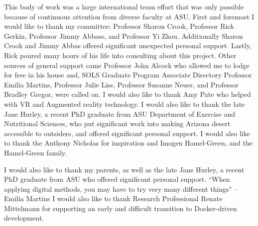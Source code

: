 This body of work was a large international team effort that was only possible because of continuous attention from diverse faculty at ASU. 
\linebreak 
\linebreak 
First and foremost I would like to thank my committee: Professor Sharon Crook, Professor Rick Gerkin, Professor Jimmy Abbass, and Professor Yi Zhou. 
Additionally Sharon Crook and Jimmy Abbas offered significant unexpected personal support.
Lastly, Rick poured many hours of his life into consulting about this project.
\linebreak 
\linebreak 
Other sources of general support came Professor John Alcock who allowed me to lodge for free in his house and, SOLS Graduate Program Associate Directory Professor Emilia Martins, Professor Julie Liss, Professor Susanne Neuer, and Professor Bradley Gregor, were called on. I would also like to thank Amy Pate who helped with VR and Augmented reality technology.
\linebreak 
\linebreak 
I would also like to thank the late Jane Hurley, a recent PhD graduate from ASU Department of Exercise and Nutritional Sciences, who put significant work into making Arizona desert accessible to outsiders, and offered significant personal support.
I would also like to thank the Anthony Nicholas for inspiration and Imogen Hamel-Green, and the Hamel-Green family.

\linebreak 
\linebreak 
I would also like to thank my parents, as well as the late Jane Hurley, a recent PhD graduate from ASU who offered significant personal support.
\linebreak 
\linebreak 
``When applying digital methods, you may have to try very many different things" -- Emilia Martins
\linebreak 
\linebreak 
I would also like to thank Research Professional Renate Mittelmann for supporting an early and difficult transition to Docker-driven development.
